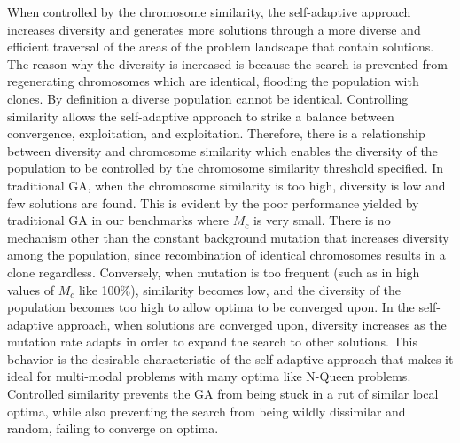 \documentclass[conference]{IEEEtran}
\begin{document}
When controlled by the chromosome similarity, the self-adaptive approach increases diversity and generates more solutions through a more diverse and efficient traversal of the areas of the problem landscape that contain solutions. The reason why the diversity is increased is because the search is prevented from regenerating chromosomes which are identical, flooding the population with clones. By definition a diverse population cannot be identical. Controlling similarity allows the self-adaptive approach to strike a balance between convergence, exploitation, and exploitation. Therefore, there is a relationship between diversity and chromosome similarity which enables the diversity of the population to be controlled by the chromosome similarity threshold specified. In traditional GA, when the chromosome similarity is too high, diversity is low and few solutions are found. This is evident by the poor performance yielded by traditional GA in our benchmarks where $M_{c}$ is very small. There is no mechanism other than the constant background mutation that increases diversity among the population, since recombination of identical chromosomes results in a clone regardless. Conversely, when mutation is too frequent (such as in high values of $M_{c}$ like 100\%), similarity becomes low, and the diversity of the population becomes too high to allow optima to be converged upon. In the self-adaptive approach, when solutions are converged upon, diversity increases as the mutation rate adapts in order to expand the search to other solutions. This behavior is the desirable characteristic of the self-adaptive approach that makes it ideal for multi-modal problems with many optima like N-Queen problems. Controlled similarity prevents the GA from being stuck in a rut of similar local optima, while also preventing the search from being wildly dissimilar and random, failing to converge on optima.
\end{document}

